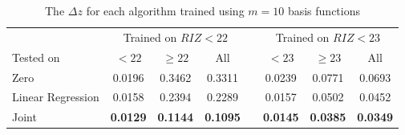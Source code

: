 \documentclass[useAMS,usenatbib,fleqn]{mn2e}
\begin{document}
 \begin{table}
\caption{The $\Delta z$ for each algorithm trained using $m=10$ basis functions}
\begin{center}
  \begin{tabular}{| l | c | c | c | c | c | c | c | }
  							& 	\multicolumn{3}{|c|}{Trained on $RIZ<22$}				&	& 	\multicolumn{3}{c}{Trained on $RIZ<23$} \\ \cline{2-4} \cline{6-8} 
     	Tested on					&	$<22$			&	$\ge 22$		&	All				&	&	$<23$	&	$\ge 23$	&	All	\\	\hline
	Zero						&	0.0196			&	0.3462			&	0.3311			&	&	0.0239	&	0.0771	&	0.0693					\\
	Linear Regression			&	0.0158			&	0.2394			&	0.2289			&	&	0.0157	&	0.0502	&	0.0452				\\
	Joint						&	\textbf{0.0129}	&	\textbf{0.1144}	&	\textbf{0.1095}	&	&	\textbf{0.0145}	&	\textbf{0.0385}	&	\textbf{0.0349}			\\	\hline
  \end{tabular}
\end{center}
\label{table-RIZ-splits}
\end{table}
\end{document}
